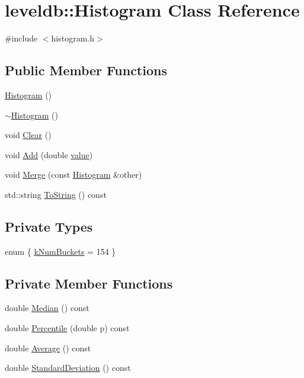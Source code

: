 \hypertarget{classleveldb_1_1_histogram}{\section{leveldb\-:\-:Histogram Class Reference}
\label{classleveldb_1_1_histogram}
}


{\ttfamily \#include $<$histogram.\-h$>$}

\subsection*{Public Member Functions}
\begin{DoxyCompactItemize}
\item 
\hyperlink{classleveldb_1_1_histogram_a2b4d29303598913c7021d077e5a8b10f}{Histogram} ()
\item 
\hyperlink{classleveldb_1_1_histogram_a3f6375d4ef50956a540262a3cf720f13}{$\sim$\-Histogram} ()
\item 
void \hyperlink{classleveldb_1_1_histogram_ab30a7e767693010656d90bfd361ecb91}{Clear} ()
\item 
void \hyperlink{classleveldb_1_1_histogram_a7dd7147b7f6548f0bebde25ca40e4457}{Add} (double \hyperlink{cache_8cc_a0f61d63b009d0880a89c843bd50d8d76}{value})
\item 
void \hyperlink{classleveldb_1_1_histogram_a22befd197208f0142b236917bcadf196}{Merge} (const \hyperlink{classleveldb_1_1_histogram}{Histogram} \&other)
\item 
std\-::string \hyperlink{classleveldb_1_1_histogram_a78fde129eef6d9072ff986afd18d1163}{To\-String} () const 
\end{DoxyCompactItemize}
\subsection*{Private Types}
\begin{DoxyCompactItemize}
\item 
enum \{ \hyperlink{classleveldb_1_1_histogram_ab80178436a059da1cf5f6e9a5f76a747a6ea13d53f7e3910a6b7c293d48d0a0da}{k\-Num\-Buckets} = 154
 \}
\end{DoxyCompactItemize}
\subsection*{Private Member Functions}
\begin{DoxyCompactItemize}
\item 
double \hyperlink{classleveldb_1_1_histogram_acb3844fbaeeed8998843a4314904121a}{Median} () const 
\item 
double \hyperlink{classleveldb_1_1_histogram_a58aaefb11df105f26e9da73148b85a47}{Percentile} (double p) const 
\item 
double \hyperlink{classleveldb_1_1_histogram_a72836120dc9000bd63048c2b53f21a64}{Average} () const 
\item 
double \hyperlink{classleveldb_1_1_histogram_a5eaea641e2c7c95364c98f5314e37d77}{Standard\-Deviation} () const 
\end{DoxyCompactItemize}

